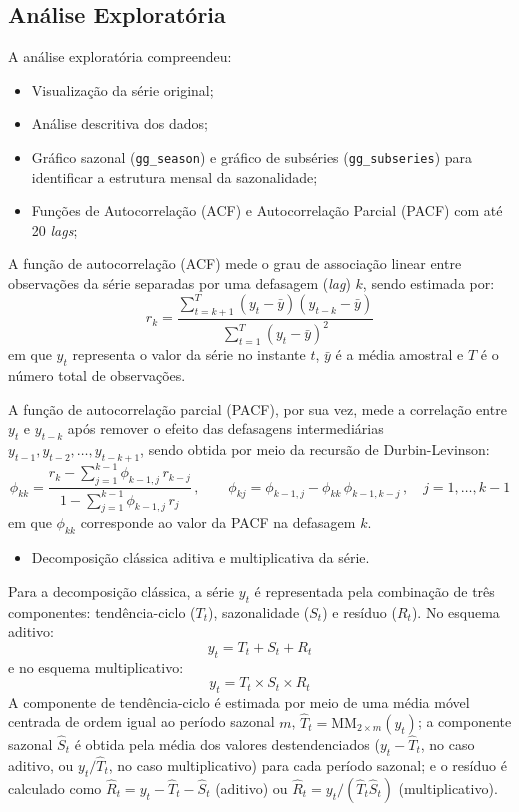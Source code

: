 \documentclass[12pt, a4paper]{article}
\newcommand{\pkg}[1]{\texttt{#1}}
\begin{document}
\subsection{Análise Exploratória}

A análise exploratória compreendeu:
\begin{itemize}
  \item Visualização da série original;
  \item Análise descritiva dos dados;
  \item Gráfico sazonal (\pkg{gg\_season}) e gráfico de subséries
        (\pkg{gg\_subseries}) para identificar a estrutura mensal da
        sazonalidade;
  \item Funções de Autocorrelação (ACF) e Autocorrelação Parcial
        (PACF) com até 20 \emph{lags};
\end{itemize}

A função de autocorrelação (ACF) mede o grau de associação linear entre observações da série separadas por uma defasagem (\emph{lag}) $k$, sendo estimada por:
\begin{equation}
  r_k = \frac{\displaystyle\sum_{t=k+1}^{T}(y_t-\bar{y})(y_{t-k}-\bar{y})}{\displaystyle\sum_{t=1}^{T}(y_t-\bar{y})^2}
\end{equation}
em que $y_t$ representa o valor da série no instante $t$, $\bar{y}$ é a média amostral e $T$ é o número total de observações.

A função de autocorrelação parcial (PACF), por sua vez, mede a correlação entre $y_t$ e $y_{t-k}$ após remover o efeito das defasagens intermediárias $y_{t-1}, y_{t-2}, \dots, y_{t-k+1}$, sendo obtida por meio da recursão de Durbin-Levinson:
\begin{equation}
  \phi_{kk} = \frac{\displaystyle r_k - \sum_{j=1}^{k-1}\phi_{k-1,j}\,r_{k-j}}{\displaystyle 1-\sum_{j=1}^{k-1}\phi_{k-1,j}\,r_j}\,, \qquad
  \phi_{kj} = \phi_{k-1,j}-\phi_{kk}\,\phi_{k-1,k-j}\,, \quad j=1,\dots,k-1
\end{equation}
em que $\phi_{kk}$ corresponde ao valor da PACF na defasagem $k$.

\begin{itemize}
    \item Decomposição clássica aditiva e multiplicativa da série.
\end{itemize}
Para a decomposição clássica, a série $y_t$ é representada pela combinação de três componentes: tendência-ciclo ($T_t$), sazonalidade ($S_t$) e resíduo ($R_t$). No esquema aditivo:
\begin{equation}
  y_t = T_t + S_t + R_t
\end{equation}
e no esquema multiplicativo:
\begin{equation}
  y_t = T_t \times S_t \times R_t
\end{equation}
A componente de tendência-ciclo é estimada por meio de uma média móvel centrada de ordem igual ao período sazonal $m$, $\hat{T}_t = \text{MM}_{2\times m}(y_t)$; a componente sazonal $\hat{S}_t$ é obtida pela média dos valores destendenciados ($y_t-\hat{T}_t$, no caso aditivo, ou $y_t/\hat{T}_t$, no caso multiplicativo) para cada período sazonal; e o resíduo é calculado como $\hat{R}_t = y_t-\hat{T}_t-\hat{S}_t$ (aditivo) ou $\hat{R}_t = y_t/(\hat{T}_t\hat{S}_t)$ (multiplicativo).
\end{document}
